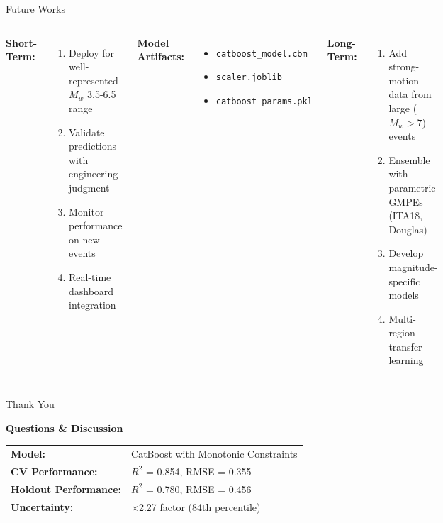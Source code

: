 \documentclass[aspectratio=169,11pt]{beamer}
\begin{document}
\begin{frame}{Future Works}
\begin{columns}[T]
\textbf{Short-Term:}
\begin{enumerate}
    \item Deploy for well-represented $M_w$ 3.5-6.5 range
    \item Validate predictions with engineering judgment
    \item Monitor performance on new events
    \item Real-time dashboard integration
\end{enumerate}

\vspace{0.3cm}
\textbf{Model Artifacts:}
\begin{itemize}
    \item \texttt{catboost\_model.cbm}
    \item \texttt{scaler.joblib}
    \item \texttt{catboost\_params.pkl}
\end{itemize}

\textbf{Long-Term:}
\begin{enumerate}
    \item Add strong-motion data from large ($M_w > 7$) events
    \item Ensemble with parametric GMPEs (ITA18, Douglas)
    \item Develop magnitude-specific models
    \item Multi-region transfer learning
\end{enumerate}
\end{columns}
\end{frame}

\begin{frame}{Thank You}
\begin{center}
\Large\textbf{Questions \& Discussion}

\vspace{0.8cm}
\normalsize
\begin{tabular}{@{}ll@{}}
\textbf{Model:} & CatBoost with Monotonic Constraints \\
\textbf{CV Performance:} & $R^2$ = 0.854, RMSE = 0.355 \\
\textbf{Holdout Performance:} & $R^2$ = 0.780, RMSE = 0.456 \\
\textbf{Uncertainty:} & $\times$2.27 factor (84th percentile) \\
\end{tabular}
\end{center}
\end{frame}
\end{document}
